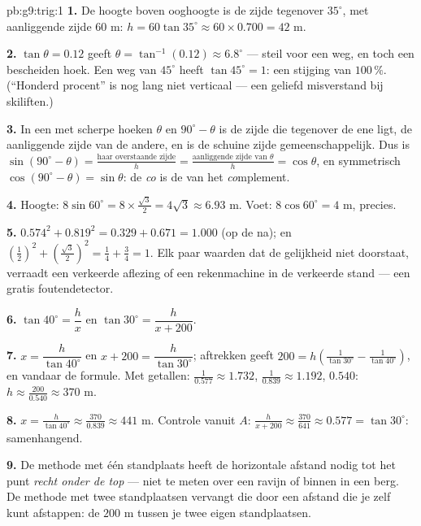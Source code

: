 \begin{solution}{pb:g9:trig:1}
\textbf{1.} De hoogte boven ooghoogte is de zijde tegenover $35^\circ$, met
aanliggende zijde $60$ m: $h = 60 \tan 35^\circ \approx 60 \times 0.700 = 42$ m.

\textbf{2.} $\tan\theta = 0.12$ geeft $\theta = \tan^{-1}(0.12) \approx
6.8^\circ$ --- steil voor een weg, en toch een bescheiden hoek. Een weg van
$45^\circ$ heeft $\tan 45^\circ = 1$: een stijging van $100\,\%$. (``Honderd
procent'' is nog lang niet verticaal --- een geliefd misverstand bij skiliften.)

\textbf{3.} In een  met scherpe hoeken $\theta$ en
$90^\circ - \theta$ is de zijde die tegenover de ene ligt, de aanliggende zijde van
de andere, en is de schuine zijde gemeenschappelijk. Dus is
$\sin(90^\circ - \theta) = \frac{\text{haar overstaande zijde}}{h} =
\frac{\text{aanliggende zijde van }\theta}{h} = \cos\theta$, en symmetrisch
$\cos(90^\circ - \theta) = \sin\theta$: de \emph{co} is de  van het
\emph{co}mplement.

\textbf{4.} Hoogte: $8 \sin 60^\circ = 8 \times \frac{\sqrt3}{2} = 4\sqrt3
\approx 6.93$ m. Voet: $8 \cos 60^\circ = 4$ m, precies.

\textbf{5.} $0.574^2 + 0.819^2 = 0.329 + 0.671 = 1.000$ (op de  na); en
$\left(\frac12\right)^2 + \left(\frac{\sqrt3}{2}\right)^2 = \frac14 + \frac34 =
1$. Elk paar waarden dat de gelijkheid niet doorstaat, verraadt een verkeerde
aflezing of een rekenmachine in de verkeerde stand --- een gratis foutendetector.

\textbf{6.} $\tan 40^\circ = \dfrac hx$ en $\tan 30^\circ = \dfrac{h}{x + 200}$.

\textbf{7.} $x = \dfrac{h}{\tan 40^\circ}$ en
$x + 200 = \dfrac{h}{\tan 30^\circ}$; aftrekken geeft
$200 = h\left(\frac{1}{\tan 30^\circ} - \frac{1}{\tan 40^\circ}\right)$, en
vandaar de formule. Met getallen: $\frac{1}{0.577} \approx 1.732$,
$\frac{1}{0.839} \approx 1.192$,  $0.540$:
$h \approx \frac{200}{0.540} \approx 370$ m.

\textbf{8.} $x = \frac{h}{\tan 40^\circ} \approx \frac{370}{0.839} \approx 441$ m.
Controle vanuit $A$: $\frac{h}{x + 200} \approx \frac{370}{641} \approx 0.577 =
\tan 30^\circ$: samenhangend.

\textbf{9.} De methode met één standplaats heeft de horizontale afstand nodig tot
het punt \emph{recht onder de top} --- niet te meten over een ravijn of binnen in
een berg. De methode met twee standplaatsen vervangt die door een afstand die je
zelf kunt afstappen: de $200$ m tussen je twee eigen standplaatsen.


\end{solution}
